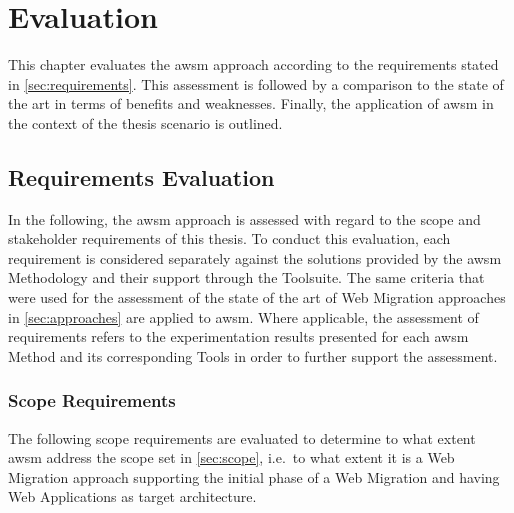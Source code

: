 \hypertarget{sec:evaluation}{%
\chapter{Evaluation}\label{sec:evaluation}}

This chapter evaluates the \gls{awsm} approach according to the requirements stated in \cref{sec:requirements}.
This assessment is followed by a comparison to the state of the art in terms of benefits and weaknesses.
Finally, the application of \gls{awsm} in the context of the thesis scenario is outlined.

\vspace{-15pt}
\hypertarget{requirements-evaluation}{%
\section{Requirements Evaluation}\label{requirements-evaluation}}
\vspace{15pt}

In the following, the \gls{awsm} approach is assessed with regard to the scope and stakeholder requirements of this thesis.
To conduct this evaluation, each requirement is considered separately against the solutions provided by the \gls{awsm} Methodology and their support through the Toolsuite.
The same criteria that were used for the assessment of the state of the art of \gls{Web Migration} approaches in \cref{sec:approaches} are applied to \gls{awsm}.
Where applicable, the assessment of requirements refers to the experimentation results presented for each \gls{awsm} Method and its corresponding Tools in order to further support the assessment.

\vspace{-10pt}
\hypertarget{sec:evaluation.scope-requirements}{%
\subsection{Scope Requirements}\label{sec:evaluation.scope-requirements}}
\vspace{10pt}

The following scope requirements are evaluated to determine to what extent \gls{awsm} address the scope set in \cref{sec:scope}, i.e.~to what extent it is a \gls{Web Migration} approach supporting the initial phase of a \gls{Web Migration} and having \glspl{Web Application} as target architecture.

